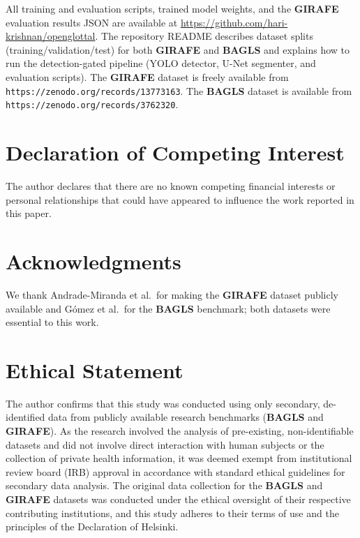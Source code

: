 \documentclass[preprint,12pt]{elsarticle}
\newcommand{\girafe}{\textbf{GIRAFE}}
\newcommand{\bagls}{\textbf{BAGLS}}
\begin{document}
All training and evaluation scripts, trained model weights, and the
\girafe{} evaluation results JSON are available at
\url{https://github.com/hari-krishnan/openglottal}.
The repository README describes dataset splits (training/validation/test) for
both \girafe{} and \bagls{} and explains how to run the detection-gated
pipeline (YOLO detector, U-Net segmenter, and evaluation scripts).
The \girafe{} dataset \cite{andrade2025datainbrief} is freely available from
\texttt{https://zenodo.org/records/13773163}.
The \bagls{} dataset \cite{gomez2020bagls} is available from
\texttt{https://zenodo.org/records/3762320}.

\section*{Declaration of Competing Interest}
The author declares that there are no known competing financial interests or
personal relationships that could have appeared to influence the work reported
in this paper.

\section*{Acknowledgments}
We thank Andrade-Miranda et al.\ for making the \girafe{} dataset publicly
available and G\'{o}mez et al.\ for the \bagls{} benchmark; both datasets were
essential to this work.

\section*{Ethical Statement}
The author confirms that this study was conducted using only secondary,
de-identified data from publicly available research benchmarks (\bagls{} and
\girafe{}).
As the research involved the analysis of pre-existing, non-identifiable
datasets and did not involve direct interaction with human subjects or the
collection of private health information, it was deemed exempt from
institutional review board (IRB) approval in accordance with standard ethical
guidelines for secondary data analysis.
The original data collection for the \bagls{} and \girafe{} datasets was
conducted under the ethical oversight of their respective contributing
institutions, and this study adheres to their terms of use and the principles
of the Declaration of Helsinki.



\end{document}
